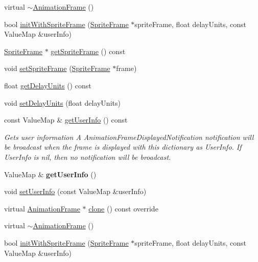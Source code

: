 \begin{DoxyCompactItemize}
virtual \hyperlink{classAnimationFrame_af9da581313899adf881d6c1578cfa198}{$\sim$\+Animation\+Frame} ()
\item 
bool \hyperlink{classAnimationFrame_a161dcf4b8dfa1c8cb262a5f77c22dc94}{init\+With\+Sprite\+Frame} (\hyperlink{classSpriteFrame}{Sprite\+Frame} $\ast$sprite\+Frame, float delay\+Units, const Value\+Map \&user\+Info)
\item 
\hyperlink{classSpriteFrame}{Sprite\+Frame} $\ast$ \hyperlink{classAnimationFrame_a474a334b0df47b93e3f6bd64f81ad440}{get\+Sprite\+Frame} () const
\item 
void \hyperlink{classAnimationFrame_afd21a7ef4ceb50204e79ed6e6ac80530}{set\+Sprite\+Frame} (\hyperlink{classSpriteFrame}{Sprite\+Frame} $\ast$frame)
\item 
float \hyperlink{classAnimationFrame_a79c7bbdfce3d7c977571eec61c7bfa72}{get\+Delay\+Units} () const
\item 
void \hyperlink{classAnimationFrame_afb9b22fd6b69fe33245df07fec1ce125}{set\+Delay\+Units} (float delay\+Units)
\item 
const Value\+Map \& \hyperlink{classAnimationFrame_a8af9011b2cf3227e52134e7a42aad1dc}{get\+User\+Info} () const
\begin{DoxyCompactList}\small\item\em Gets user information A Animation\+Frame\+Displayed\+Notification notification will be broadcast when the frame is displayed with this dictionary as User\+Info. If User\+Info is nil, then no notification will be broadcast. \end{DoxyCompactList}\item 
\mbox{\label{classAnimationFrame_a5149191a1ec4d4441517d8bbfc45ca99}} 
Value\+Map \& {\bfseries get\+User\+Info} ()
\item 
void \hyperlink{classAnimationFrame_a5478d94008d0c0980e1618a4443f7c15}{set\+User\+Info} (const Value\+Map \&user\+Info)
\item 
virtual \hyperlink{classAnimationFrame}{Animation\+Frame} $\ast$ \hyperlink{classAnimationFrame_aa67af008dfdd27d42a61dcf1e77bca02}{clone} () const override
\item 
virtual \hyperlink{classAnimationFrame_a593ab6cb54f66bb9a31e9d0842ebccc4}{$\sim$\+Animation\+Frame} ()
\item 
bool \hyperlink{classAnimationFrame_a161dcf4b8dfa1c8cb262a5f77c22dc94}{init\+With\+Sprite\+Frame} (\hyperlink{classSpriteFrame}{Sprite\+Frame} $\ast$sprite\+Frame, float delay\+Units, const Value\+Map \&user\+Info)
\end{DoxyCompactItemize}
